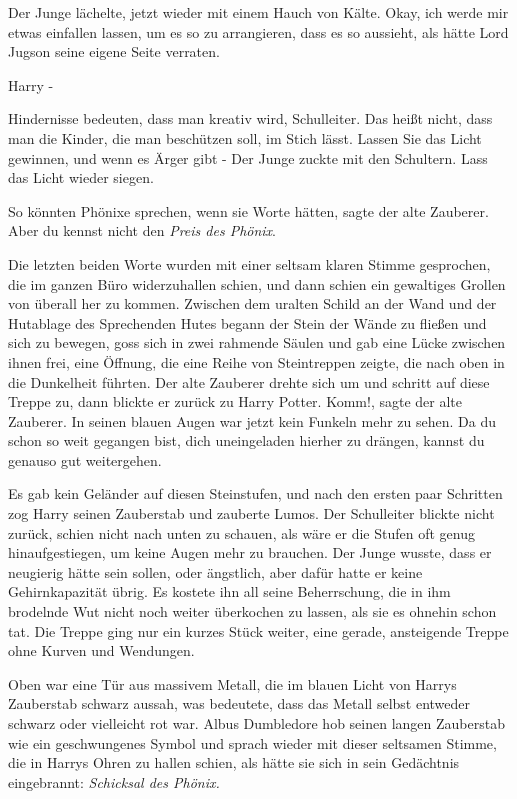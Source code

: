 Der Junge lächelte, jetzt wieder mit einem Hauch von Kälte. \glqq{}Okay, ich
werde mir etwas einfallen lassen, um es so zu arrangieren, dass es so aussieht,
als hätte Lord Jugson seine eigene Seite verraten.\grqq{}

\glqq{}Harry -\grqq{}

\glqq{}Hindernisse bedeuten, dass man kreativ wird, Schulleiter. Das heißt nicht,
dass man die Kinder, die man beschützen soll, im Stich lässt. Lassen Sie das
Licht gewinnen, und wenn es Ärger gibt -\grqq{} Der Junge zuckte mit den
Schultern. \glqq{}Lass das Licht wieder siegen.\grqq{}

\glqq{}So könnten Phönixe sprechen, wenn sie Worte hätten\grqq{}, sagte der alte
Zauberer. \glqq{}Aber du kennst nicht den \emph{Preis des Phönix}.\grqq{}

Die letzten beiden Worte wurden mit einer seltsam klaren Stimme gesprochen, die
im ganzen Büro widerzuhallen schien, und dann schien ein gewaltiges Grollen von
überall her zu kommen. Zwischen dem uralten Schild an der Wand und der Hutablage
des Sprechenden Hutes begann der Stein der Wände zu fließen und sich zu bewegen,
goss sich in zwei rahmende Säulen und gab eine Lücke zwischen ihnen frei, eine
Öffnung, die eine Reihe von Steintreppen zeigte, die nach oben in die Dunkelheit
führten. Der alte Zauberer drehte sich um und schritt auf diese Treppe zu, dann
blickte er zurück zu Harry Potter. \glqq{}Komm!\grqq{}, sagte der alte Zauberer.
In seinen blauen Augen war jetzt kein Funkeln mehr zu sehen. \glqq{}Da du schon
so weit gegangen bist, dich uneingeladen hierher zu drängen, kannst du genauso
gut weitergehen.\grqq{}

Es gab kein Geländer auf diesen Steinstufen, und nach den ersten paar Schritten
zog Harry seinen Zauberstab und zauberte Lumos. Der Schulleiter blickte nicht
zurück, schien nicht nach unten zu schauen, als wäre er die Stufen oft genug
hinaufgestiegen, um keine Augen mehr zu brauchen. Der Junge wusste, dass er
neugierig hätte sein sollen, oder ängstlich, aber dafür hatte er keine
Gehirnkapazität übrig. Es kostete ihn all seine Beherrschung, die in ihm
brodelnde Wut nicht noch weiter überkochen zu lassen, als sie es ohnehin schon
tat. Die Treppe ging nur ein kurzes Stück weiter, eine gerade, ansteigende
Treppe ohne Kurven und Wendungen.

Oben war eine Tür aus massivem Metall, die im blauen Licht von Harrys Zauberstab
schwarz aussah, was bedeutete, dass das Metall selbst entweder schwarz oder
vielleicht rot war. Albus Dumbledore hob seinen langen Zauberstab wie ein
geschwungenes Symbol und sprach wieder mit dieser seltsamen Stimme, die in
Harrys Ohren zu hallen schien, als hätte sie sich in sein Gedächtnis
eingebrannt: \glqq{}\emph{Schicksal des Phönix.}\grqq{}

